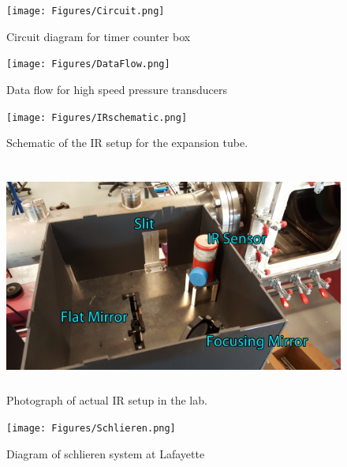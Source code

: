 \begin{figure}
\centering
\texttt{[image: Figures/Circuit.png]}
\caption[Circuit Diagram for Timer Counter Box]{Circuit diagram for timer counter box}
\label{fig:TCCircuit}
\end{figure}


\begin{figure}[p!]
\centering
\texttt{[image: Figures/DataFlow.png]}
\caption[Data Flow for High Speed Pressure Transducers]{Data flow for high speed pressure transducers}
\label{fig:DataFlow}
\end{figure}
\clearpage

\begin{figure}
\centering
\texttt{[image: Figures/IRschematic.png]}
\caption[IR setup diagram]{Schematic of the IR setup for the expansion tube.}
\label{fig:IRschematic}
\end{figure}

\begin{figure}
\centering
\includegraphics[height = 3in]{Figures/IRLabeled.jpg}
\caption[Labeled photograph of IR setup]{Photograph of actual IR setup in the lab.}
\label{fig:IRlabel}
\end{figure}



\begin{figure}
\centering
\texttt{[image: Figures/Schlieren.png]}
\caption[Schlieren Diagram]{Diagram of schlieren system at Lafayette}
\label{fig:schlieren}
\end{figure}